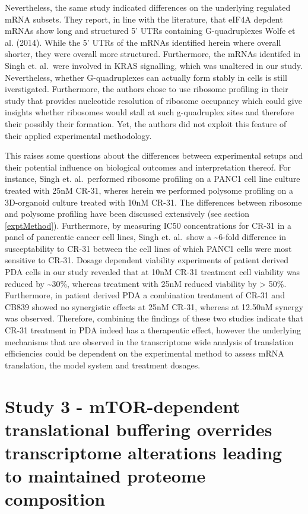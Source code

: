 \documentclass[
  12pt,
  openany]{book}
\begin{document}
Nevertheless, the same study indicated differences on the underlying regulated mRNA subsets. They report, in line with the literature, that eIF4A depdent mRNAs show long and structured 5' UTRs containing G-quadruplexes Wolfe et al. (2014). While the 5' UTRs of the mRNAs identified herein where overall shorter, they were overall more structured. Furthermore, the mRNAs identifed in Singh et. al.~were involved in KRAS signalling, which was unaltered in our study. Nevertheless, whether G-quadruplexes can actually form stably in cells is still iverstigated. Furthermore, the authors chose to use ribosome profiling in their study that provides nucleotide resolution of ribosome occupancy which could give insights whether ribosomes would stall at such g-quadruplex sites and therefore their possibly their formation. Yet, the authors did not exploit this feature of their applied experimental methodology.

This raises some questions about the differences between experimental setups and their potential influence on biological outcomes and interpretation thereof. For instance, Singh et. al.~performed ribosome profiling on a PANC1 cell line culture treated with 25nM CR-31, wheres herein we performed polysome profiling on a 3D-organoid culture treated with 10nM CR-31. The differences between ribosome and polysome profiling have been discussed extensively (see section \ref{exptMethod}). Furthermore, by measuring IC50 concentrations for CR-31 in a panel of pancreatic cancer cell lines, Singh et. al.~show a \textasciitilde6-fold difference in susceptability to CR-31 between the cell lines of which PANC1 cells were most sensitive to CR-31. Dosage dependent viability experiments of patient derived PDA cells in our study revealed that at 10nM CR-31 treatment cell viability was reduced by \textasciitilde30\%, whereas treatment with 25nM reduced viability by \textgreater{} 50\%. Furthermore, in patient derived PDA a combination treatment of CR-31 and CB839 showed no synergistic effects at 25nM CR-31, whereas at 12.50nM synergy was observed. Therefore, combining the findings of these two studies indicate that CR-31 treatment in PDA indeed has a therapeutic effect, however the underlying mechanisms that are observed in the transcriptome wide analysis of translation efficiencies could be dependent on the experimental method to assess mRNA translation, the model system and treatment dosages.
\newline

\section{Study 3 - mTOR-dependent translational buffering overrides transcriptome alterations leading to
maintained proteome composition}
\end{document}
